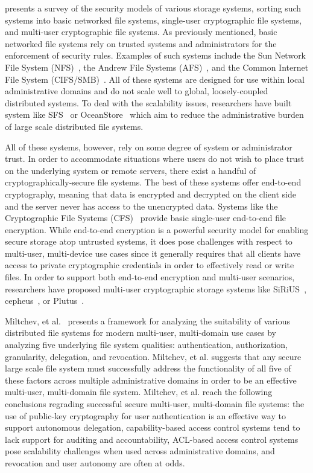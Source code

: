 \cite{kher2005} presents a survey of the security models of various
storage systems, sorting such systems into basic networked file
systems, single-user cryptographic file systems, and multi-user
cryptographic file systems. As previously mentioned, basic networked
file systems rely on trusted systems and administrators for the
enforcement of security rules. Examples of such systems include the
Sun Network File System (NFS)~\cite{sandberg1985}, the Andrew File
Systems (AFS)~\cite{howard1988}, and the Common Internet File System
(CIFS/SMB)~\cite{microsoft-smb2}. All of these systems are designed
for use within local administrative domains and do not scale well to
global, loosely-coupled distributed systems. To deal with the
scalability issues, researchers have built system like
SFS~\cite{mazieres1999} or OceanStore~\cite{kubiatowicz2000} which aim
to reduce the administrative burden of large scale distributed file
systems.

All of these systems, however, rely on some degree of system or
administrator trust. In order to accommodate situations where users do
not wish to place trust on the underlying system or remote servers,
there exist a handful of cryptographically-secure file systems. The
best of these systems offer end-to-end cryptography, meaning that data
is encrypted and decrypted on the client side and the server never has
access to the unencrypted data.  Systems like the Cryptographic File
Systems (CFS)~\cite{blaze1993} provide basic single-user end-to-end
file encryption. While end-to-end encryption is a powerful security
model for enabling secure storage atop untrusted systems, it does pose
challenges with respect to multi-user, multi-device use cases since it
generally requires that all clients have access to private
cryptographic credentials in order to effectively read or write
files. In order to support both end-to-end encryption and multi-user
scenarios, researchers have proposed multi-user cryptographic storage
systems like SiRiUS~\cite{goh2003}, cepheus~\cite{fu1998}, or
Plutus~\cite{kallahalla2003}.

Miltchev, et al.~\cite{miltchev2008} presents a framework for
analyzing the suitability of various distributed file systems for
modern multi-user, multi-domain use cases by analyzing five underlying
file system qualities: authentication, authorization, granularity,
delegation, and revocation. Miltchev, et al. suggests that any secure
large scale file system must successfully address the functionality of
all five of these factors across multiple administrative domains in
order to be an effective multi-user, multi-domain file
system. Miltchev, et al. reach the following conclusions regrading
successful secure multi-user, multi-domain file systems: the use of
public-key cryptography for user authentication is an effective way to
support autonomous delegation, capability-based access control systems
tend to lack support for auditing and accountability, ACL-based access
control systems pose scalability challenges when used across
administrative domains, and revocation and user autonomy are often at
odds.

